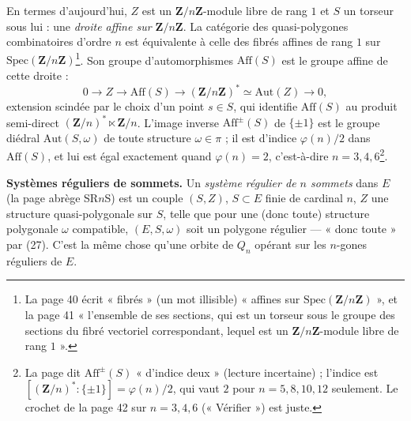 \documentclass[11pt,a4paper]{article}
\begin{document}
En termes d'aujourd'hui, $Z$ est un $\mathbf{Z}/n\mathbf{Z}$-module libre de
rang $1$ et $S$ un torseur sous lui : une \emph{droite affine sur
$\mathbf{Z}/n\mathbf{Z}$}. La catégorie des quasi-polygones combinatoires
d'ordre $n$ est équivalente à celle des fibrés affines de rang $1$ sur
$\mathrm{Spec}(\mathbf{Z}/n\mathbf{Z})$\footnote{La page 40 écrit « fibrés
» (un mot illisible) « affines sur $\mathrm{Spec}(\mathbf{Z}/n\mathbf{Z})$ », et la
page 41 « l'ensemble de ses sections, qui est un torseur sous le groupe des
sections du fibré vectoriel correspondant, lequel est un
$\mathbf{Z}/n\mathbf{Z}$-module libre de rang $1$ ».}. Son groupe
d'automorphismes $\mathrm{Aff}(S)$ est le groupe affine de cette droite :
\[
  0 \longrightarrow Z \longrightarrow \mathrm{Aff}(S) \longrightarrow
  (\mathbf{Z}/n\mathbf{Z})^{*} \simeq \mathrm{Aut}(Z) \longrightarrow 0 ,
\]
extension scindée par le choix d'un point $s \in S$, qui identifie
$\mathrm{Aff}(S)$ au produit semi-direct $(\mathbf{Z}/n)^{*} \ltimes
\mathbf{Z}/n$. L'image inverse $\mathrm{Aff}^{\pm}(S)$ de $\{\pm 1\}$ est le
groupe diédral $\mathrm{Aut}(S, \omega)$ de toute structure $\omega \in \pi$ ;
il est d'indice $\varphi(n)/2$ dans $\mathrm{Aff}(S)$, et lui est égal
exactement quand $\varphi(n) = 2$, c'est-à-dire $n = 3, 4, 6$\footnote{La page
dit $\mathrm{Aff}^{\pm}(S)$ « d'indice deux » (lecture incertaine) ; l'indice
est $[(\mathbf{Z}/n)^{*} : \{\pm 1\}] = \varphi(n)/2$, qui vaut $2$ pour
$n = 5, 8, 10, 12$ seulement. Le crochet de la page 42 sur $n = 3, 4, 6$
(« Vérifier ») est juste.}.

\textbf{Systèmes réguliers de sommets.} Un \emph{système régulier de $n$
sommets} dans $E$ (la page abrège SR$n$S) est un couple $(S, Z)$, $S \subset
E$ finie de cardinal $n$, $Z$ une structure quasi-polygonale sur $S$, telle que
pour une (donc toute) structure polygonale $\omega$ compatible, $(E, S,
\omega)$ soit un polygone régulier --- « donc toute » par (27). C'est la même
chose qu'une orbite de $Q_n$ opérant sur les $n$-gones réguliers de $E$.
\end{document}
